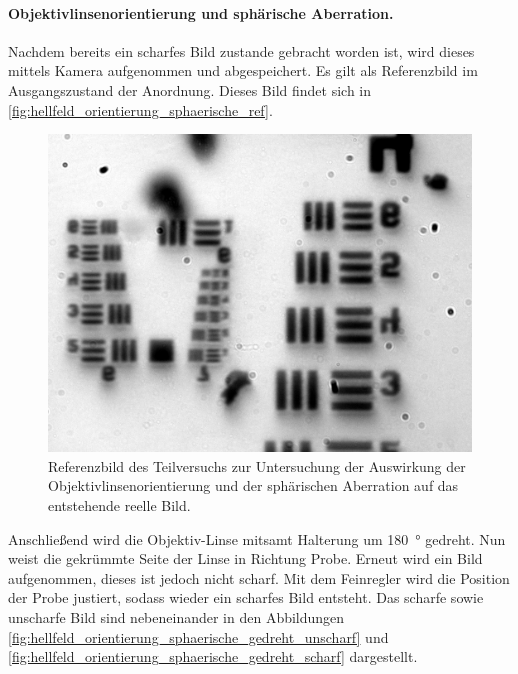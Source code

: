\documentclass[ngerman]{scrartcl}
\begin{document}
\paragraph{Objektivlinsenorientierung und sphärische Aberration.}
Nachdem bereits ein scharfes Bild zustande gebracht worden ist, wird dieses mittels Kamera aufgenommen und abgespeichert. Es gilt als Referenzbild im Ausgangszustand der Anordnung. Dieses Bild findet sich in \autoref{fig:hellfeld_orientierung_sphaerische_ref}.
%
\begin{figure}[H]
    \centering
    \begin{samepage}
        \includegraphics[width=0.475\linewidth]{fig/Versuch3/hellfeld_3.1_vorher.jpg}
        \caption[Hellfeld Orientierung und sphärische Aberration]{Referenzbild des Teilversuchs zur Untersuchung der Auswirkung der Objektivlinsenorientierung und der sphärischen Aberration auf das entstehende reelle Bild.}
        \label{fig:hellfeld_orientierung_sphaerische_ref}
    \end{samepage}
\end{figure}
%
Anschließend wird die Objektiv-Linse mitsamt Halterung um \SI{180}{\degree} gedreht. Nun weist die gekrümmte Seite der Linse in Richtung Probe. Erneut wird ein Bild aufgenommen, dieses ist jedoch nicht scharf. Mit dem Feinregler wird die Position der Probe justiert, sodass wieder ein scharfes Bild entsteht. Das scharfe sowie unscharfe Bild sind nebeneinander in den Abbildungen \ref{fig:hellfeld_orientierung_sphaerische_gedreht_unscharf} und \ref{fig:hellfeld_orientierung_sphaerische_gedreht_scharf} dargestellt.
%
\setcapindent{0pt}
\end{document}
